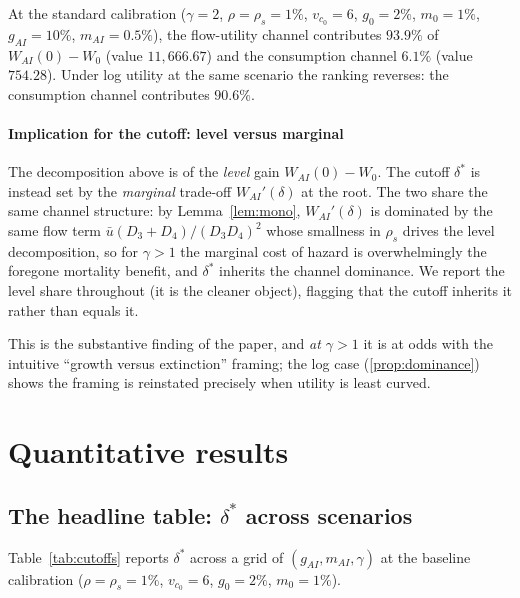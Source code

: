 \documentclass{_latex/house}
\begin{document}
\begin{corollary}
\label{cor:cal}
At the standard calibration ($\gamma = 2$, $\rho = \rho_s = 1\%$, $v_{c_0} = 6$, $g_0 = 2\%$, $m_0 = 1\%$, $g_{AI} = 10\%$, $m_{AI} = 0.5\%$), the flow-utility channel contributes $93.9\%$ of $W_{AI}(0)-W_0$ (value $11{,}666.67$) and the consumption channel $6.1\%$ (value $754.28$). Under log utility at the same scenario the ranking reverses: the consumption channel contributes $90.6\%$.
\end{corollary}

\paragraph{Implication for the cutoff: level versus marginal} The decomposition above is of the \emph{level} gain $W_{AI}(0)-W_0$. The cutoff $\delta^*$ is instead set by the \emph{marginal} trade-off $W_{AI}'(\delta)$ at the root. The two share the same channel structure: by Lemma~\ref{lem:mono}, $W_{AI}'(\delta)$ is dominated by the same flow term $\bar u(D_3+D_4)/(D_3 D_4)^2$ whose smallness in $\rho_s$ drives the level decomposition, so for $\gamma>1$ the marginal cost of hazard is overwhelmingly the foregone mortality benefit, and $\delta^*$ inherits the channel dominance. We report the level share throughout (it is the cleaner object), flagging that the cutoff inherits it rather than equals it.

This is the substantive finding of the paper, and \emph{at $\gamma>1$} it is at odds with the intuitive ``growth versus extinction'' framing; the log case (\cref{prop:dominance}) shows the framing is reinstated precisely when utility is least curved.

\section{Quantitative results}
\label{sec:results}

\subsection{The headline table: $\delta^*$ across scenarios}

Table~\ref{tab:cutoffs} reports $\delta^*$ across a grid of $(g_{AI}, m_{AI}, \gamma)$ at the baseline calibration ($\rho = \rho_s = 1\%$, $v_{c_0} = 6$, $g_0 = 2\%$, $m_0 = 1\%$).
\end{document}
